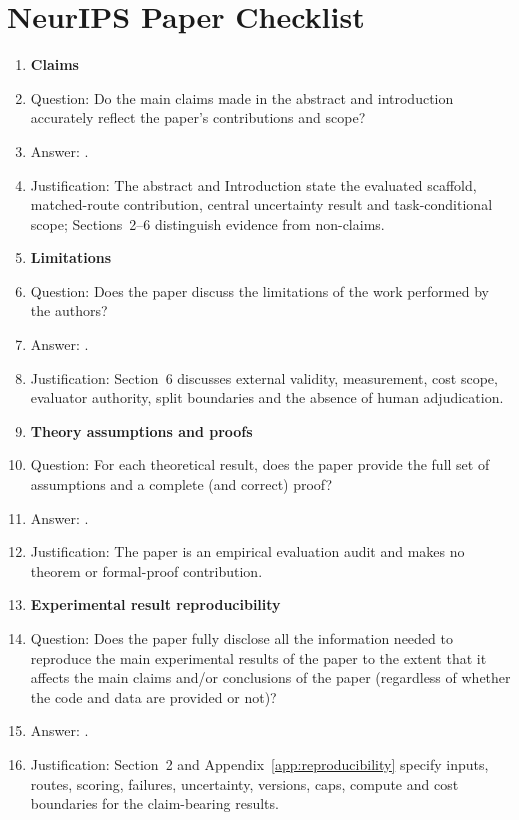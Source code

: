 \section*{NeurIPS Paper Checklist}

\begin{enumerate}

\item {\bf Claims}
\item[] Question: Do the main claims made in the abstract and introduction accurately reflect the paper's contributions and scope?
\item[] Answer: \answerYes{}.
\item[] Justification: The abstract and Introduction state the evaluated scaffold, matched-route contribution, central uncertainty result and task-conditional scope; Sections~2--6 distinguish evidence from non-claims.

\item {\bf Limitations}
\item[] Question: Does the paper discuss the limitations of the work performed by the authors?
\item[] Answer: \answerYes{}.
\item[] Justification: Section~6 discusses external validity, measurement, cost scope, evaluator authority, split boundaries and the absence of human adjudication.

\item {\bf Theory assumptions and proofs}
\item[] Question: For each theoretical result, does the paper provide the full set of assumptions and a complete (and correct) proof?
\item[] Answer: \answerNA{}.
\item[] Justification: The paper is an empirical evaluation audit and makes no theorem or formal-proof contribution.

\item {\bf Experimental result reproducibility}
\item[] Question: Does the paper fully disclose all the information needed to reproduce the main experimental results of the paper to the extent that it affects the main claims and/or conclusions of the paper (regardless of whether the code and data are provided or not)?
\item[] Answer: \answerYes{}.
\item[] Justification: Section~2 and Appendix~\ref{app:reproducibility} specify inputs, routes, scoring, failures, uncertainty, versions, caps, compute and cost boundaries for the claim-bearing results.


\end{enumerate}
